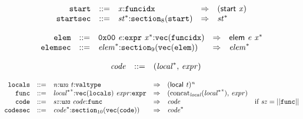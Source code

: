 \vspace{1ex}

$$
\begin{array}{@{}l@{}rrlll@{}l@{}}
& {\mathtt{start}} &::=& {\mathit{x}}{:}{\mathtt{funcidx}} &\Rightarrow& (\mathsf{start}~{\mathit{x}}) \\
& {\mathtt{startsec}} &::=& {{\mathit{st}}^\ast}{:}{{\mathtt{section}}}_{8}({\mathtt{start}}) &\Rightarrow& {{\mathit{st}}^\ast} \\
\end{array}
$$

\vspace{1ex}

$$
\begin{array}{@{}l@{}rrlll@{}l@{}}
& {\mathtt{elem}} &::=& \mathtt{0x00}~{\mathit{e}}{:}{\mathtt{expr}}~{{\mathit{x}}^\ast}{:}{\mathtt{vec}}({\mathtt{funcidx}}) &\Rightarrow& \mathsf{elem}~{\mathit{e}}~{{\mathit{x}}^\ast} \\
& {\mathtt{elemsec}} &::=& {{\mathit{elem}}^\ast}{:}{{\mathtt{section}}}_{9}({\mathtt{vec}}({\mathtt{elem}})) &\Rightarrow& {{\mathit{elem}}^\ast} \\
\end{array}
$$

\vspace{1ex}

$$
\begin{array}{@{}lrrl@{}l@{}}
& {\mathit{code}} &::=& ({{\mathit{local}}^\ast},\, {\mathit{expr}}) \\
\end{array}
$$

$$
\begin{array}{@{}l@{}rrlll@{}l@{}}
& {\mathtt{locals}} &::=& {\mathit{n}}{:}{\mathtt{u{\scriptstyle32}}}~{\mathit{t}}{:}{\mathtt{valtype}} &\Rightarrow& {(\mathsf{local}~{\mathit{t}})^{{\mathit{n}}}} \\
& {\mathtt{func}} &::=& {{{\mathit{local}}^\ast}^\ast}{:}{\mathtt{vec}}({\mathtt{locals}})~{\mathit{expr}}{:}{\mathtt{expr}} &\Rightarrow& ({{\mathrm{concat}}}_{{\mathit{local}}}({{{\mathit{local}}^\ast}^\ast}),\, {\mathit{expr}}) \\
& {\mathtt{code}} &::=& {\mathit{sz}}{:}{\mathtt{u{\scriptstyle32}}}~{\mathit{code}}{:}{\mathtt{func}} &\Rightarrow& {\mathit{code}} &\quad
  \mbox{if}~{\mathit{sz}} = ||{\mathtt{func}}|| \\
& {\mathtt{codesec}} &::=& {{\mathit{code}}^\ast}{:}{{\mathtt{section}}}_{10}({\mathtt{vec}}({\mathtt{code}})) &\Rightarrow& {{\mathit{code}}^\ast} \\
\end{array}
$$

